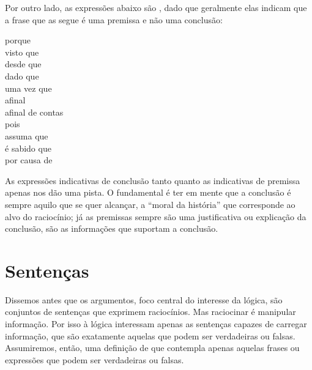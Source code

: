 Por outro lado, as expressões abaixo são , dado que geralmente elas indicam que a frase que as segue é uma premissa e não uma conclusão:
	\begin{center}
		porque\\ visto que\\ desde que\\ dado que\\ uma vez que\\ afinal\\ afinal de contas\\ pois\\ assuma que\\ é sabido que\\ por causa de
	\end{center}
As expressões indicativas de conclusão tanto quanto as indicativas de premissa apenas nos dão uma pista.
O fundamental é ter em mente que a conclusão é sempre aquilo que se quer alcançar, a ``moral da história'' que corresponde ao alvo do raciocínio; já as premissas sempre são uma justificativa ou explicação da conclusão, são as informações que suportam a conclusão. 

\section{Sentenças}
\label{intro.sentences}



Dissemos antes que os argumentos, foco central do interesse da lógica, são conjuntos de sentenças que exprimem raciocínios.
Mas raciocinar é manipular informação.
Por isso à lógica interessam apenas as sentenças capazes de carregar informação, que são exatamente aquelas que podem ser verdadeiras ou falsas.
Assumiremos, então, uma definição de  que contempla apenas aquelas frases ou expressões que podem ser verdadeiras ou falsas.

